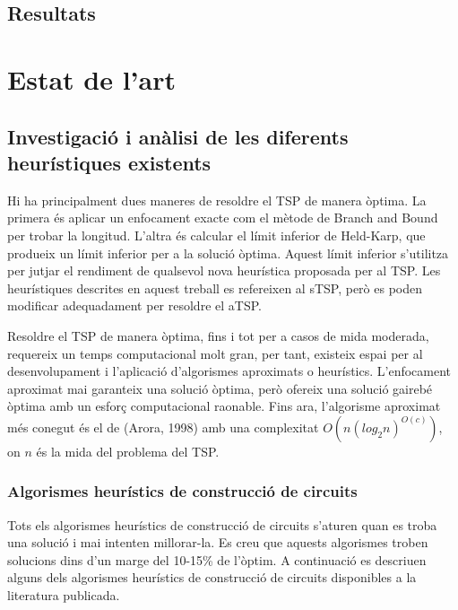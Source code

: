 \documentclass[a4paper,12pt,twoside]{ThesisStyle}
\begin{document}
\section{Resultats}
\label{Resultats}




























\chapter{Estat de l'art}
\label{cap:estat}

\section{Investigació i anàlisi de les diferents heurístiques existents}
\label{SolucionsClassiques}
Hi ha principalment dues maneres de resoldre el TSP de manera òptima. La primera és aplicar un enfocament exacte com el mètode de Branch and Bound per trobar la longitud. L'altra és calcular el límit inferior de Held-Karp, que produeix un límit inferior per a la solució òptima. Aquest límit inferior s'utilitza per jutjar el rendiment de qualsevol nova heurística proposada per al TSP. Les heurístiques descrites en aquest treball es refereixen al sTSP, però es poden modificar adequadament per resoldre el aTSP.

\medskip

Resoldre el TSP de manera òptima, fins i tot per a casos de mida moderada, requereix un temps computacional molt gran, per tant, existeix espai per al desenvolupament i l'aplicació d'algorismes aproximats o heurístics. L'enfocament aproximat mai garanteix una solució òptima, però ofereix una solució gairebé òptima amb un esforç computacional raonable. Fins ara, l'algorisme aproximat més conegut és el de (Arora, 1998) amb una complexitat \( O \left( n \left( log_2 n \right) ^{O(c)} \right) \), on \( n \) és la mida del problema del TSP.

\subsection{Algorismes heurístics de construcció de circuits}
\label{AlgorismesHeuristicsConstruccio}
Tots els algorismes heurístics de construcció de circuits s'aturen quan es troba una solució i mai intenten millorar-la. Es creu que aquests algorismes troben solucions dins d'un marge del 10-15\% de l'òptim. A continuació es descriuen alguns dels algorismes heurístics de construcció de circuits disponibles a la literatura publicada.
\end{document}
